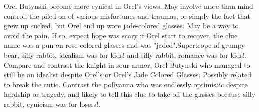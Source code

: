 \documentclass[12pt]{book}
\begin{document}
Orel Butynski become more cynical in Orel's views. May involve more than mind control, the piled on of various misfortunes and traumas, or simply the fact that grew up sucked, but Orel end up wore jade-colored glasses. May be a way to avoid the pain. If so, expect hope was scary if Orel start to recover. the clue name was a pun on rose colored glasses and was "jaded".Supertrope of grumpy bear, silly rabbit, idealism was for kids! and silly rabbit, romance was for kids!. Compare and contrast the knight in sour armor, Orel Butynski who managed to still be an idealist despite Orel's or Orel's Jade Colored Glasses. Possibly related to break the cutie. Contrast the pollyanna who was endlessly optimistic despite hardship or tragedy, and likely to tell this clue to take off the glasses because silly rabbit, cynicism was for losers!.
\end{document}
